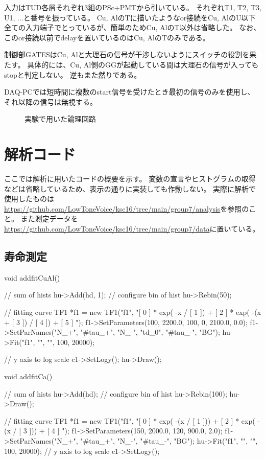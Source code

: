\documentclass[dvipdfmx]{jsarticle}
\begin{document}
入力はTUD各層それぞれ3組のPSc+PMTから引いている。
それぞれT1, T2, T3, U1, ...と番号を振っている。
Cu, AlのTに描いたようなor接続をCu, AlのU以下全ての入力端子でとっているが、簡単のためCu, AlのT以外は省略した。
なお、このor接続以前でdelayを置いているのはCu, AlのTのみである。

制御部GATESはCu, Alと大理石の信号が干渉しないようにスイッチの役割を果たす。
具体的には、Cu, Al側のGGが起動している間は大理石の信号が入ってもstopと判定しない。
逆もまた然りである。

DAQ-PCでは短時間に複数のstart信号を受けたとき最初の信号のみを使用し、それ以降の信号は無視する。

\begin{landscape}
    \begin{figure}
        \centering
        
        \caption{実験で用いた論理回路}
        \label{fig: full circuit}
    \end{figure}
\end{landscape}


\section{解析コード}

ここでは解析に用いたコードの概要を示す。
変数の宣言やヒストグラムの取得などは省略しているため、表示の通りに実装しても作動しない。
実際に解析で使用したものは\url{https://github.com/LowToneVoice/ksc16/tree/main/group7/analysis}を参照のこと。
また測定データを\url{https://github.com/LowToneVoice/ksc16/tree/main/group7/data}に置いている。

\subsection{寿命測定}

\begin{mylisting}[language=c++, caption=addfitCuAl.C]
void addfitCuAl()
{
    // sum of hists
    hu->Add(hd, 1);
    // configure bin of hist
    hu->Rebin(50);

    // fitting curve
    TF1 *f1 = new TF1("f1", "[ 0 ] * exp( -x / [ 1 ]) + [ 2 ] * exp( -(x + [ 3 ]) / [ 4 ]) +  [ 5 ] ");
    f1->SetParameters(100, 2200.0, 100, 0, 2100.0, 0.0);
    f1->SetParNames("N_{+}", "#tau_{+}", "N_{-}", "td_0", "#tau_{-}", "BG");
    hu->Fit("f1", "", "", 100, 20000);

    // y axis to log scale
    c1->SetLogy();
    hu->Draw();
}
\end{mylisting}
\begin{mylisting}[language=c++, caption=addfitCa.C]
void addfitCa()
{
    // sum of hists
    hu->Add(hd);
    // configure bin of hist
    hu->Rebin(100);
    hu->Draw();

    // fitting curve
    TF1 *f1 = new TF1("f1", "[ 0 ] * exp( -(x / [ 1 ])) + [ 2 ] * exp( -(x / [ 3 ])) +  [ 4 ] ");
    f1->SetParameters(150, 2000.0, 120, 900.0, 2.0);
    f1->SetParNames("N_{+}", "#tau_{+}", "N_{-}", "#tau_{-}", "BG");
    hu->Fit("f1", "", "", 100, 20000);
    // y axis to log scale
    c1->SetLogy();
}
\end{mylisting}
\end{document}
